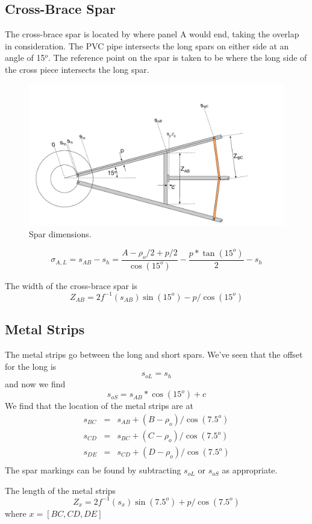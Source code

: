\documentclass{article}
\begin{document}
\subsection{Cross-Brace Spar}
The cross-brace spar is located by where panel A would end, taking the overlap in consideration.  The PVC pipe intersects the long spars on either side at an angle of 15$^o$.  The reference point on the spar is taken to be where the long side of the cross piece intersects the long spar.
\begin{figure}[H]
\includegraphics[width=1.0\textwidth]{spardims.pdf}
\centering
\vspace{-.15in}
\caption{Spar dimensions.}
\label{fig:spardims}
\end{figure}
\begin{equation}
\sigma_{A,L} = s_{AB} - s_h = \frac{A - \rho_o/2 + p/2}{\cos(15^o)} - \frac{p*\tan(15^o)}{2} - s_h
\end{equation}

The width of the cross-brace spar is
\begin{equation}
Z_{AB} = 2f^{-1}(s_{AB})\sin(15^o) - p/\cos(15^o)
\end{equation}

\subsection{Metal Strips}
The metal strips go between the long and short spars.  We've seen that the offset for the long is
\begin{equation}
s_{oL} = s_h
\end{equation}
and now we find
\begin{equation}
s_{oS} = s_{AB}*\cos(15^o) + c
\end{equation}
We find that the location of the metal strips are at
\begin{eqnarray}
s_{BC} & = & s_{AB} + (B - \rho_o)/\cos(7.5^o) \\
s_{CD} & = & s_{BC} + (C - \rho_o)/\cos(7.5^o) \\
s_{DE} & = & s_{CD} + (D - \rho_o)/\cos(7.5^o) \\
\end{eqnarray}
The spar markings can be found by subtracting $s_{oL}$ or $s_{oS}$ as appropriate.

The length of the metal strips
\begin{equation}
Z_{x} = 2f^{-1}(s_{x})\sin(7.5^o) + p/\cos(7.5^o)
\end{equation}
where $x = [BC,CD,DE]$
\end{document}
